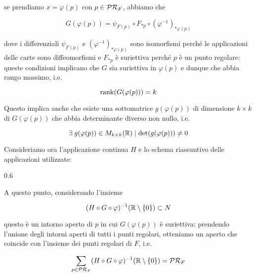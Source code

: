 {se prendiamo $ x = \varphi(p) $ con $ p \in \mathcal{PR}_{F} $, abbiamo che

\begin{equation}
	G(\varphi(p)) = \psi_{F(p)} \circ F_{*p} \circ (\varphi^{-1})_{*\varphi(p)}
\end{equation}

dove i differenziali $ \psi_{F(p)} $ e $ (\varphi^{-1})_{*\varphi(p)} $ sono isomorfismi perché le applicazioni delle carte sono diffeomorfismi e $ F_{*p} $ è suriettiva perché $ p $ è un punto regolare: queste condizioni implicano che $ G $ sia suriettiva in $ \varphi(p) $ e dunque che abbia rango massimo, i.e.

\begin{equation}
	\rank(G(\varphi(p))) = k
\end{equation}

Questo implica anche che esiste una sottomatrice $ g(\varphi(p)) $ di dimensione $ k \times k $ di $ G(\varphi(p)) $ che abbia determinante diverso non nullo, i.e.

\begin{equation}
	\exists \; g(\varphi(p)) \in M_{k \times k}(\mathbb{R}) \mid \det(g(\varphi(p))) \neq 0
\end{equation}

Consideriamo ora l'applicazione continua $ H $ e lo schema riassuntivo delle applicazioni utilizzate:

	{0.6}{%
			}

A questo punto, considerando l'insieme

\begin{equation}
	(H \circ G \circ \varphi)^{-1} (\mathbb{R} \setminus \{0\}) \subset N
\end{equation}

questo è un intorno aperto di $ p $ in cui $ G(\varphi(p)) $ è suriettiva: prendendo l'unione degli intorni aperti di tutti i punti regolari, otteniamo un aperto che coincide con l'insieme dei punti regolari di $ F $, i.e.

\begin{equation}
	\sum_{p \in \mathcal{PR}_{F}} (H \circ G \circ \varphi)^{-1} (\mathbb{R} \setminus \{0\}) = \mathcal{PR}_{F}
\end{equation}
}

